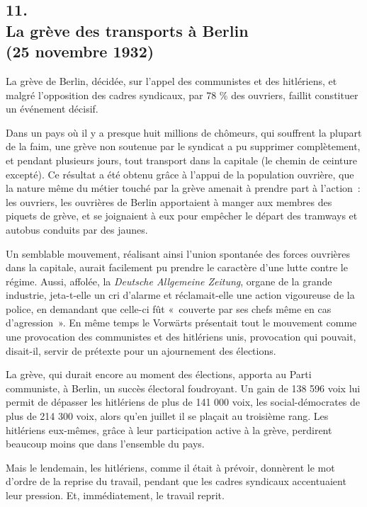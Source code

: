 \documentclass[french,twoside]{book} %
\begin{document}
\subsection[11. La grève des transports à Berlin, (25 novembre 1932)]{11. \\
La grève des transports à Berlin \\
(25 novembre 1932)}
\noindent \par
La grève de Berlin, décidée, sur l'appel des communistes et des hitlériens, et malgré l'opposition des cadres syndicaux, par 78 \% des ouvriers, faillit constituer un événement décisif.\par
Dans un pays où il y a presque huit millions de chômeurs, qui souffrent la plupart de la faim, une grève non soutenue par le syndicat a pu supprimer complètement, et pendant plusieurs jours, tout transport dans la capitale (le chemin de ceinture excepté). Ce résultat a été obtenu grâce à l'appui de la population ouvrière, que la nature même du métier touché par la grève amenait à prendre part à l'action : les ouvriers, les ouvrières de Berlin appor­taient à manger aux membres des piquets de grève, et se joignaient à eux pour empêcher le départ des tramways et autobus conduits par des jaunes.\par
Un semblable mouvement, réalisant ainsi l'union spontanée des forces ouvrières dans la capitale, aurait facilement pu prendre le caractère d'une lutte contre le régime. Aussi, affolée, la {\itshape Deutsche Allgemeine Zeitung}, organe de la grande industrie, jeta-t-elle un cri d'alarme et réclamait-elle une action vigou­reuse de la police, en demandant que celle-ci fût « couverte par ses chefs même en cas d'agression ». En même temps le Vorwärts présentait tout le mouvement comme une provocation des communistes et des hitlériens unis, provocation qui pouvait, disait-il, servir de prétexte pour un ajournement des élections.\par
La grève, qui durait encore au moment des élections, apporta au Parti communiste, à Berlin, un succès électoral foudroyant. Un gain de 138 596 voix lui permit de dépasser les hitlériens de plus de 141 000 voix, les social-démocrates de plus de 214 300 voix, alors qu'en juillet il se plaçait au troisième rang. Les hitlériens eux-mêmes, grâce à leur participation active à la grève, perdirent beaucoup moins que dans l'ensemble du pays.\par
Mais le lendemain, les hitlériens, comme il était à prévoir, donnèrent le mot d'ordre de la reprise du travail, pendant que les cadres syndicaux accen­tuaient leur pression. Et, immédiatement, le travail reprit.\par
\end{document}
